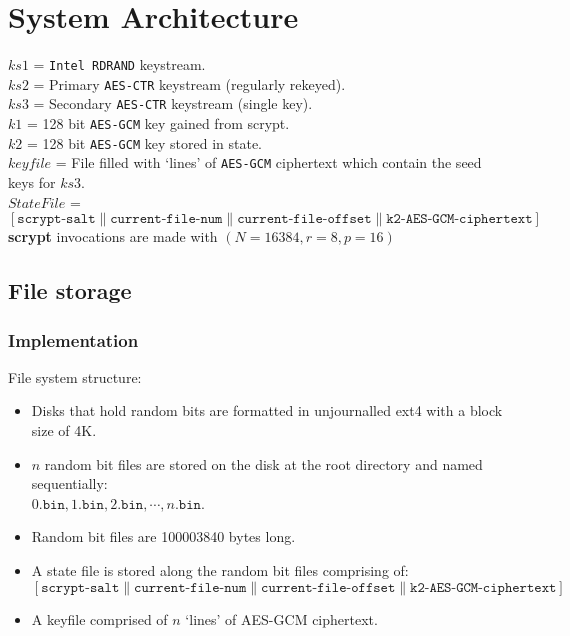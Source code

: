 \documentclass{paper}
\begin{document}
		\section{System Architecture}
			$\mathit{ks1}$ = \texttt{Intel RDRAND} keystream.\\
			$\mathit{ks2}$ = Primary \texttt{AES-CTR} keystream (regularly rekeyed).\\
			$\mathit{ks3}$ = Secondary \texttt{AES-CTR} keystream (single key).\\
			$\mathit{k1}$ = 128 bit \texttt{AES-GCM} key gained from scrypt.\\
			$\mathit{k2}$ = 128 bit \texttt{AES-GCM} key stored in state.\\
			$\mathit{keyfile}$ = File filled with `lines' of \texttt{AES-GCM} ciphertext which contain the seed keys for $\mathit{ks3}$.\\
			$\mathit{StateFile}$ = $\left[ \texttt{scrypt-salt}\parallel\texttt{current-file-num}\parallel\texttt{current-file-offset}\parallel\texttt{k2-AES-GCM-ciphertext}\right]$\\
			\textbf{scrypt} invocations are made with $(N=16384,r=8,p=16)$
			\subsection{File storage}
				\subsubsection{Implementation}
					File system structure: \vspace{-0.75em}
					\begin{itemize}
					\setlength\itemsep{-0.3em}
					\item Disks that hold random bits are formatted in unjournalled ext4 with a block size of 4K.
					\item $n$ random bit files are stored on the disk at the root directory and named sequentially:\\
					$0.\texttt{bin}, 1.\texttt{bin}, 2.\texttt{bin}, \cdots , n.\texttt{bin}$.
					\item Random bit files are 100003840 bytes long.
					\item A state file is stored along the random bit files comprising of:\\ $\left[ \texttt{scrypt-salt}\parallel\texttt{current-file-num}\parallel\texttt{current-file-offset}\parallel\texttt{k2-AES-GCM-ciphertext}\right]$ 
					\item A keyfile comprised of $n$ `lines' of AES-GCM ciphertext.
					\end{itemize}
\end{document}
